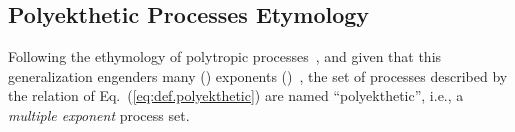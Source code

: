     \subsection{Polyekthetic Processes Etymology}

    Following the  ethymology  of  polytropic  processes~\cite{2020-NaaktgeborenC-engrXiv},  and
    given    that    this    generalization    engenders    many    ()    exponents
    ()~\cite{1997-ManiatoglouMPF-Porto}, the set of processes described  by  the
    relation  of   Eq.~(\ref{eq:def.polyekthetic})   are   named   ``polyekthetic'',   i.e.,   a
    \emph{multiple exponent} process set.


